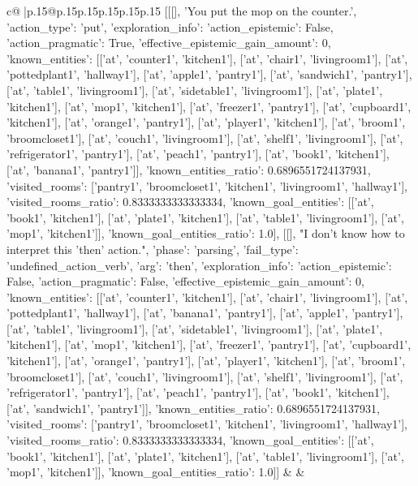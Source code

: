 \documentclass{article}
\begin{document}
{\begin{supertabular}{c@{$\;$}|p{.15\linewidth}@{}p{.15\linewidth}p{.15\linewidth}p{.15\linewidth}p{.15\linewidth}p{.15\linewidth}}
{{{	 [[[], 'You put the mop on the counter.', {'action_type': 'put', 'exploration_info': {'action_epistemic': False, 'action_pragmatic': True, 'effective_epistemic_gain_amount': 0, 'known_entities': [['at', 'counter1', 'kitchen1'], ['at', 'chair1', 'livingroom1'], ['at', 'pottedplant1', 'hallway1'], ['at', 'apple1', 'pantry1'], ['at', 'sandwich1', 'pantry1'], ['at', 'table1', 'livingroom1'], ['at', 'sidetable1', 'livingroom1'], ['at', 'plate1', 'kitchen1'], ['at', 'mop1', 'kitchen1'], ['at', 'freezer1', 'pantry1'], ['at', 'cupboard1', 'kitchen1'], ['at', 'orange1', 'pantry1'], ['at', 'player1', 'kitchen1'], ['at', 'broom1', 'broomcloset1'], ['at', 'couch1', 'livingroom1'], ['at', 'shelf1', 'livingroom1'], ['at', 'refrigerator1', 'pantry1'], ['at', 'peach1', 'pantry1'], ['at', 'book1', 'kitchen1'], ['at', 'banana1', 'pantry1']], 'known_entities_ratio': 0.6896551724137931, 'visited_rooms': ['pantry1', 'broomcloset1', 'kitchen1', 'livingroom1', 'hallway1'], 'visited_rooms_ratio': 0.8333333333333334, 'known_goal_entities': [['at', 'book1', 'kitchen1'], ['at', 'plate1', 'kitchen1'], ['at', 'table1', 'livingroom1'], ['at', 'mop1', 'kitchen1']], 'known_goal_entities_ratio': 1.0}}], [[], "I don't know how to interpret this 'then' action.", {'phase': 'parsing', 'fail_type': 'undefined_action_verb', 'arg': 'then', 'exploration_info': {'action_epistemic': False, 'action_pragmatic': False, 'effective_epistemic_gain_amount': 0, 'known_entities': [['at', 'counter1', 'kitchen1'], ['at', 'chair1', 'livingroom1'], ['at', 'pottedplant1', 'hallway1'], ['at', 'banana1', 'pantry1'], ['at', 'apple1', 'pantry1'], ['at', 'table1', 'livingroom1'], ['at', 'sidetable1', 'livingroom1'], ['at', 'plate1', 'kitchen1'], ['at', 'mop1', 'kitchen1'], ['at', 'freezer1', 'pantry1'], ['at', 'cupboard1', 'kitchen1'], ['at', 'orange1', 'pantry1'], ['at', 'player1', 'kitchen1'], ['at', 'broom1', 'broomcloset1'], ['at', 'couch1', 'livingroom1'], ['at', 'shelf1', 'livingroom1'], ['at', 'refrigerator1', 'pantry1'], ['at', 'peach1', 'pantry1'], ['at', 'book1', 'kitchen1'], ['at', 'sandwich1', 'pantry1']], 'known_entities_ratio': 0.6896551724137931, 'visited_rooms': ['pantry1', 'broomcloset1', 'kitchen1', 'livingroom1', 'hallway1'], 'visited_rooms_ratio': 0.8333333333333334, 'known_goal_entities': [['at', 'book1', 'kitchen1'], ['at', 'plate1', 'kitchen1'], ['at', 'table1', 'livingroom1'], ['at', 'mop1', 'kitchen1']], 'known_goal_entities_ratio': 1.0}}]] 
	  } 
	   } 
	   } 
	 & & \\ 
 

    \theutterance {}  


\end{supertabular}}
\end{document}
